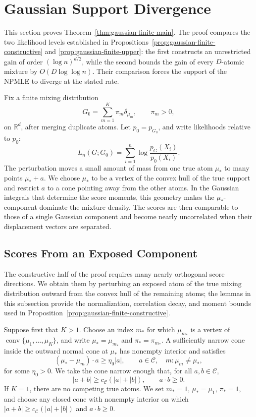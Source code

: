 \documentclass[11pt]{article}
\theoremstyle{definition}
\numberwithin{equation}{section}
\newcommand{\R}{\mathbb{R}}
\DeclareMathOperator{\conv}{conv}
\begin{document}
\section{Gaussian Support Divergence}
\label{sec:gaussian-support}

This section proves Theorem~\ref{thm:gaussian-finite-main}. The proof compares
the two likelihood levels established in
Propositions~\ref{prop:gaussian-finite-constructive} and
\ref{prop:gaussian-finite-upper}: the first constructs an unrestricted gain of
order \((\log n)^{d/2}\), while the second bounds the gain of every
\(D\)-atomic mixture by \(O(D\log\log n)\). Their comparison forces the
support of the NPMLE to diverge at the stated rate.

Fix a finite mixing distribution
\[
    G_0=\sum_{m=1}^K\pi_m\delta_{\mu_m},
    \qquad \pi_m>0,
\]
on \(\R^d\), after merging duplicate atoms.  Let \(p_0=p_{G_0}\), and write likelihoods relative to \(p_0\):
\[
    L_n(G;G_0)=\sum_{i=1}^n\log\frac{p_G(X_i)}{p_0(X_i)}.
\]
The perturbation moves a small amount of mass from one true atom \(\mu_*\) to
many points \(\mu_*+a\). We choose \(\mu_*\) to be a vertex of the convex
hull of the true support and restrict \(a\) to a cone pointing away from the
other atoms. In the Gaussian integrals that determine the score moments, this
geometry makes the \(\mu_*\)-component dominate the mixture density. The
scores are then comparable to those of a single Gaussian component and become
nearly uncorrelated when their displacement vectors are separated.

\subsection{Scores From an Exposed Component}
\label{sec:gaussian-exposed-scores}

The constructive half of the proof requires many nearly orthogonal score
directions. We obtain them by perturbing an exposed atom of the true mixing
distribution outward from the convex hull of the remaining atoms; the lemmas
in this subsection provide the normalization, correlation decay, and moment
bounds used in Proposition~\ref{prop:gaussian-finite-constructive}.

Suppose first that \(K>1\). Choose an index \(m_*\) for which
\(\mu_{m_*}\) is a vertex of
\(\conv\{\mu_1,\dots,\mu_K\}\), and write
\(\mu_*=\mu_{m_*}\) and \(\pi_*=\pi_{m_*}\). A sufficiently narrow cone
inside the outward normal cone at \(\mu_*\) has nonempty interior and satisfies
\begin{equation}
\label{eq:exposed-cone}
    (\mu_*-\mu_m)\cdot a\ge \eta_0 |a|,
    \qquad a\in\mathcal C,
    \quad m:\mu_m\ne\mu_* ,
\end{equation}
for some \(\eta_0>0\). We take the cone narrow enough that, for all
\(a,b\in\mathcal C\),
\[
    |a+b|\ge c_{\mathcal C}(|a|+|b|),
    \qquad a\cdot b\ge0.
\]
If \(K=1\), there are no competing true atoms. We set \(m_*=1\),
\(\mu_*=\mu_1\), \(\pi_*=1\), and choose any closed cone with nonempty
interior on which \(|a+b|\ge c_{\mathcal C}(|a|+|b|)\) and
\(a\cdot b\ge0\).
\end{document}
